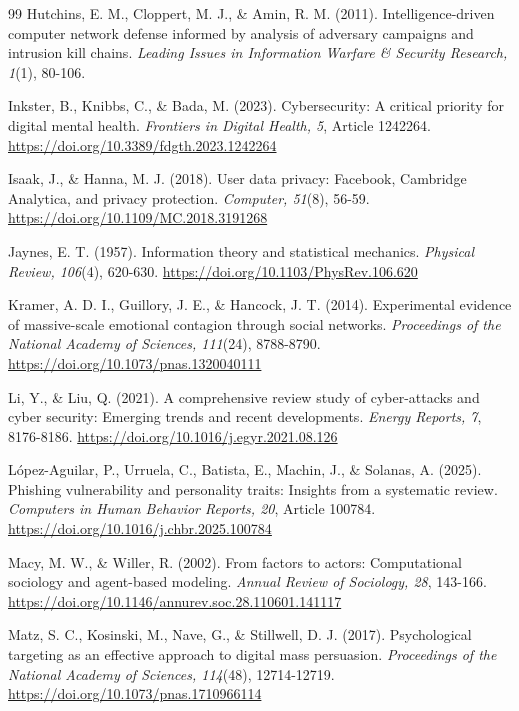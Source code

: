 \documentclass[11pt,a4paper]{article}
\newcommand{\doiurl}[1]{\href{https://doi.org/#1}{https://doi.org/#1}}
\begin{document}
\begin{thebibliography}{99}
Hutchins, E. M., Cloppert, M. J., \& Amin, R. M. (2011). Intelligence-driven computer network
defense informed by analysis of adversary campaigns and intrusion kill chains. \textit{Leading
Issues in Information Warfare \& Security Research, 1}(1), 80-106.

Inkster, B., Knibbs, C., \& Bada, M. (2023). Cybersecurity: A critical priority for digital mental
health. \textit{Frontiers in Digital Health, 5}, Article 1242264.
\doiurl{10.3389/fdgth.2023.1242264}

Isaak, J., \& Hanna, M. J. (2018). User data privacy: Facebook, Cambridge Analytica, and privacy
protection. \textit{Computer, 51}(8), 56-59. \doiurl{10.1109/MC.2018.3191268}

Jaynes, E. T. (1957). Information theory and statistical mechanics. \textit{Physical Review,
106}(4), 620-630. \doiurl{10.1103/PhysRev.106.620}

Kramer, A. D. I., Guillory, J. E., \& Hancock, J. T. (2014). Experimental evidence of
massive-scale emotional contagion through social networks. \textit{Proceedings of the National
Academy of Sciences, 111}(24), 8788-8790. \doiurl{10.1073/pnas.1320040111}

Li, Y., \& Liu, Q. (2021). A comprehensive review study of cyber-attacks and cyber security:
Emerging trends and recent developments. \textit{Energy Reports, 7}, 8176-8186.
\doiurl{10.1016/j.egyr.2021.08.126}

L\'opez-Aguilar, P., Urruela, C., Batista, E., Machin, J., \& Solanas, A. (2025). Phishing
vulnerability and personality traits: Insights from a systematic review. \textit{Computers in Human
Behavior Reports, 20}, Article 100784. \doiurl{10.1016/j.chbr.2025.100784}

Macy, M. W., \& Willer, R. (2002). From factors to actors: Computational sociology and agent-based
modeling. \textit{Annual Review of Sociology, 28}, 143-166.
\doiurl{10.1146/annurev.soc.28.110601.141117}

Matz, S. C., Kosinski, M., Nave, G., \& Stillwell, D. J. (2017). Psychological targeting as an
effective approach to digital mass persuasion. \textit{Proceedings of the National Academy of
Sciences, 114}(48), 12714-12719. \doiurl{10.1073/pnas.1710966114}


\end{thebibliography}
\end{document}
